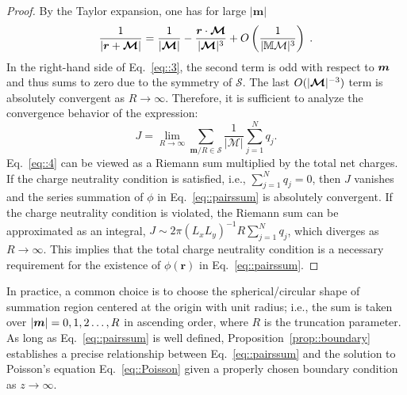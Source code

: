 \begin{proof}
	By the Taylor expansion, one has for large $|\bm{m}|$
	\begin{equation}\label{eq::3}
		\frac{1}{|\bm{r} + \bm{\mathcal{M}}|} = \frac{1}{|\bm{\mathcal{M}}|} - \frac{\bm{r} \cdot \bm{\mathcal{M}}}{|\bm{\mathcal{M}}|^3} + O \left(\frac{1}{|\mathcal{\mathbb{M} M}|^3}\right)\;.
	\end{equation}
	In the right-hand side of Eq.~\eqref{eq::3}, the second term is odd with respect to $\boldsymbol{m}$ and thus sums to zero due to the symmetry of $\mathcal{S}$. The last $O(|\boldsymbol{\mathcal{M}}|^{-3})$ term is absolutely convergent as $R\rightarrow \infty$. Therefore, it is sufficient to analyze the convergence behavior of the expression:
	\begin{equation}\label{eq::4}
        J=\lim_{R\rightarrow\infty}\sum_{\bm{m}/ R \in \mathcal{S}}\frac{1}{|\bm{\mathcal{M}}|}\sum_{j=1}^{N}q_{j}.
	\end{equation}
	Eq.~\eqref{eq::4} can be viewed as a Riemann sum multiplied by the total net charges. If the charge neutrality condition is satisfied, i.e., $\sum_{j=1}^{N}q_{j}=0$, then $J$ vanishes and the series summation of $\phi$ in Eq.~\eqref{eq::pairssum} is absolutely convergent. 
	If the charge neutrality condition is violated, the Riemann sum can be approximated as an integral, $J\sim 2\pi (L_xL_y)^{-1} R\sum_{j=1}^{N}q_{j}$, which diverges as $R\rightarrow \infty$. This implies that the total charge neutrality condition is a necessary requirement for the existence of $\phi(\bm{r})$ in Eq.~\eqref{eq::pairssum}.
\end{proof}

In practice, a common choice is to choose the spherical/circular shape of summation region centered at the origin with unit radius; i.e., the sum is taken over $\lvert\boldsymbol{m}\rvert=0, 1, 2\ldots, R$ in ascending order, where $R$ is the truncation parameter.
As long as Eq.~\eqref{eq::pairssum} is well defined, Proposition~\ref{prop::boundary} establishes a precise relationship between Eq.~\eqref{eq::pairssum} and the solution to Poisson's equation Eq.~\eqref{eq::Poisson} given a properly chosen boundary condition as $z\to\infty$.

